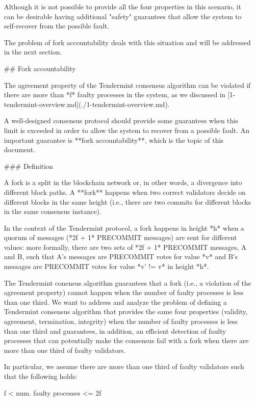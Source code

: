 \documentclass[a4paper,11pt,oneside]{report}
\begin{document}
\begin{markdown}
Although it is not possible to provide all the four properties in this scenario, it can be desirable having additional "safety" guarantees that allow the system to self-recover from the possible fault. 

The problem of fork accountability deals with this situation and will be addressed in the next section.

## Fork accountability

The agreement property of the Tendermint consensus algorithm can be violated if there are more than *f* faulty processes in the system, as we discussed in [1-tendermint-overview.md](./1-tendermint-overview.md).

A well-designed consensus protocol should provide some guarantees when this limit is exceeded in order to allow the system to recover from a possible fault. An important guarantee is **fork accountability**, which is the topic of this document. 

### Definition

A fork is a split in the blockchain network or, in other words, a divergence into different block paths. 
A **fork** happens when two correct validators decide on different blocks in the same height (i.e., there are two commits for different blocks in the same consensus instance). 

In the context of the Tendermint protocol, a fork happens in height *h* when a quorum of messages (*2f + 1* PRECOMMIT messages) are sent for different values: more formally, there are two sets of *2f + 1* PRECOMMIT messages, A and B, such that A's messages are PRECOMMIT votes for value *v* and B's messages are PRECOMMIT votes for value *v' != v* in height *h*.  

The Tendermint conensus algorithm guarantees that a fork (i.e., a violation of the agreement property) cannot happen when the number of faulty processes is less than one third.
We want to address and analyze the problem of defining a Tendermint consensus algorithm that provides the same four properties (validity, agreement, termination, integrity) when the number of faulty processes is less than one third and guarantees, in addition, an efficient detection of faulty processes that can potentially make the consensus fail with a fork when there are more than one third of faulty validators.

In particular, we assume there are more than one third of faulty validators such that the following holds:

    f < num. faulty processes <= 2f


\end{markdown}
\end{document}
